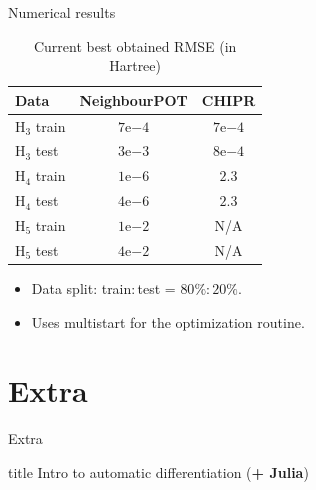 \documentclass{beamer}
\begin{document}
\begin{frame}{Numerical results}
    \begin{table}[]
        \caption{Current best obtained RMSE (in Hartree)}
        \begin{tabular}{lcc}
            \hline \hline
            Data & NeighbourPOT & CHIPR \\             
            \hline \hline
            H$_3$ train & $7$e$-4$ & $7$e$-4$ \\ 
            H$_3$ test & $3$e$-3$ & {\color{blue}$8$e$-4$} \\
            H$_4$ train & {\color{blue}$1$e$-6$} & $2.3$ \\
            H$_4$ test & {\color{blue}$4$e$-6$} & $2.3$ \\
            H$_5$ train & {\color{blue}$1$e$-2$} & N/A \\
            H$_5$ test & {\color{blue}$4$e$-2$} & N/A \\
        \end{tabular}
    \end{table}
    \vspace{0.5cm}
    \begin{itemize}
        \item Data split: train$:$test = $80\%:20\%$.
        \item Uses multistart for the optimization routine.
    \end{itemize}
\end{frame}

\section{Extra}

\begin{frame}{Extra}
    \begin{beamercolorbox}[colsep=-4bp,rounded=true,shadow=true,ht=0.3cm,dp=0.3cm,center]{title}
             Intro to automatic differentiation ({\color{red}\textbf{+ Julia}})
    \end{beamercolorbox}
\end{frame}
\end{document}
